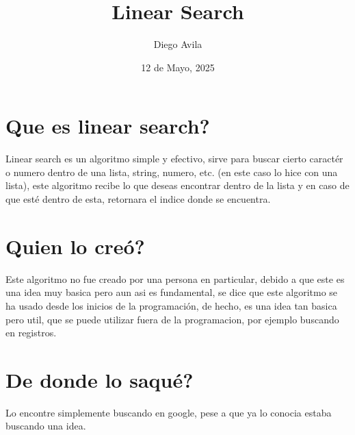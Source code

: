 \documentclass{article}
\title{Linear Search}
\author{Diego Avila}
\date{12 de Mayo, 2025}
\begin{document}
\maketitle

\section*{Que es linear search?}
\large Linear search es un algoritmo simple y efectivo, sirve para buscar cierto caractér o numero dentro de una lista, string, numero, etc. (en este caso lo hice con una lista), este algoritmo recibe lo que deseas encontrar dentro de la lista y en caso de que esté dentro de esta, retornara el indice donde se encuentra.

\section*{Quien lo creó?}
\large Este algoritmo no fue creado por una persona en particular, debido a que este es una idea muy basica pero aun asi es fundamental, se dice que este algoritmo se ha usado desde los inicios de la programación, de hecho, es una idea tan basica pero util, que se puede utilizar fuera de la programacion, por ejemplo buscando en registros.

\section*{De donde lo saqué?}
\large Lo encontre simplemente buscando en google, pese a que ya lo conocia estaba buscando una idea.
\end{document}
